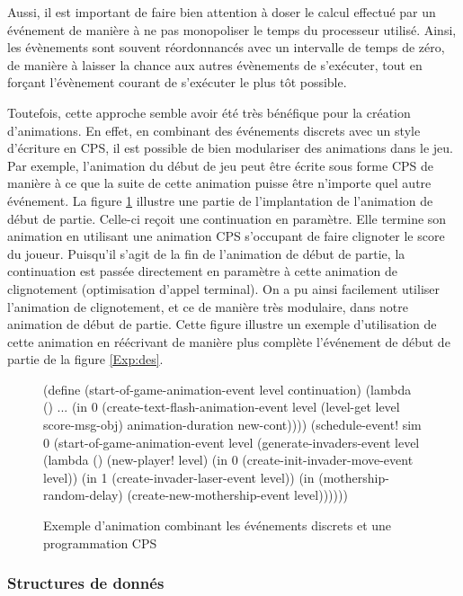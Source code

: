 \documentclass[12pt,oneside,letterpaper,francais]{book}
\begin{document}
Aussi, il est important de faire bien attention à doser le calcul
effectué par un événement de manière à ne pas monopoliser le temps du
processeur utilisé. Ainsi, les évènements sont souvent réordonnancés
avec un intervalle de temps de zéro, de manière à laisser la chance
aux autres évènements de s'exécuter, tout en forçant l'évènement
courant de s'exécuter le plus tôt possible.

Toutefois, cette approche semble avoir été très bénéfique pour la
création d'animations. En effet, en combinant des événements discrets
avec un style d'écriture en CPS, il est possible de bien modulariser
des animations dans le jeu. Par exemple, l'animation du début de jeu
peut être écrite sous forme CPS de manière à ce que la suite de cette
animation puisse être n'importe quel autre événement. La figure
\ref{Exp:anim} illustre une partie de l'implantation de l'animation de
début de partie. Celle-ci reçoit une continuation en paramètre. Elle
termine son animation en utilisant une animation CPS s'occupant de
faire clignoter le score du joueur. Puisqu'il s'agit de la fin de
l'animation de début de partie, la continuation est passée directement
en paramètre à cette animation de clignotement (optimisation d'appel
terminal). On a pu ainsi facilement utiliser l'animation de
clignotement, et ce de manière très modulaire, dans notre animation de
début de partie. Cette figure illustre un exemple d'utilisation de
cette animation en réécrivant de manière plus complète l'événement de
début de partie de la figure \ref{Exp:des}.

\begin{figure}[htb!]
  \begin{schemecode}
(define (start-of-game-animation-event level continuation)
  (lambda ()
    ...
    (in 0 (create-text-flash-animation-event level
            (level-get level score-msg-obj)
            animation-duration new-cont))))
(schedule-event! sim 0
  (start-of-game-animation-event level
    (generate-invaders-event level
      (lambda ()
        (new-player! level)
        (in 0 (create-init-invader-move-event level))
        (in 1 (create-invader-laser-event level))
        (in (mothership-random-delay)
            (create-new-mothership-event level))))))
  \end{schemecode}
  \caption{Exemple d'animation combinant les événements discrets et
    une programmation CPS}
  \label{Exp:anim}
\end{figure}

\subsubsection{Structures de donnés}
\end{document}
